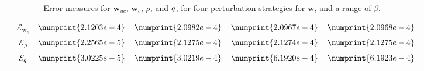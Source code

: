 \begin{table}
\begin{tabular}{ | c | c || c | c | c | c ||}
 & $\mathcal{E}_{\mathbf{w}_c}$ & $\numprint{2.1203e-4}$ & $\numprint{2.0982e-4}$ & $\numprint{2.0967e-4}$ & $\numprint{2.0968e-4}$ \\
 & $\mathcal{E}_{\rho}$ & $\numprint{2.2565e-5}$ & $\numprint{2.1275e-4}$ & $\numprint{2.1274e-4}$ & $\numprint{2.1275e-4}$ \\
 & $\mathcal{E}_{q}$ & $\numprint{3.0225e-5}$ & $\numprint{3.0219e-4}$ & $\numprint{6.1920e-4}$ & $\numprint{6.1923e-4}$ \\
\hline
\end{tabular}
\caption{Error measures for $\mathbf{w}_{uc}$, $\mathbf{w}_{c}$, $\rho$, and $q$, for four perturbation strategies for $\mathbf{w}$, and a range of $\beta$.}
\label{TabA2:Prob1}
\end{table}